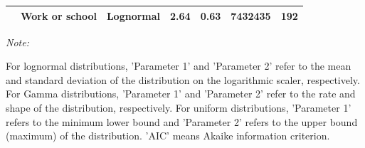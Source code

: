 \documentclass[preprint, 3p,
authoryear]{elsarticle} %
\begin{document}
\begin{table}
{\begin{threeparttable}
\begin{tabular}[t]{rllrrrr}
\multirow[t]{-12}{*}{\raggedleft\arraybackslash 2022} & Work or school & Lognormal & 2.64 & 0.63 & 7432435 & 192\\
\bottomrule
\end{tabular}
\begin{tablenotes}
\item \textit{Note: } 
\item For lognormal distributions, 'Parameter 1' and 'Parameter 2' refer to the mean and standard deviation of the distribution on the logarithmic scaler, respectively. For Gamma distributions, 'Parameter 1' and 'Parameter 2' refer to the rate and shape of the distribution, respectively. For uniform distributions,  'Parameter 1' refers to the minimum lower bound and 'Parameter 2'  refers to the upper bound (maximum) of the distribution.  'AIC' means Akaike information criterion.
\end{tablenotes}
\end{threeparttable}}
\end{table}
\end{document}
